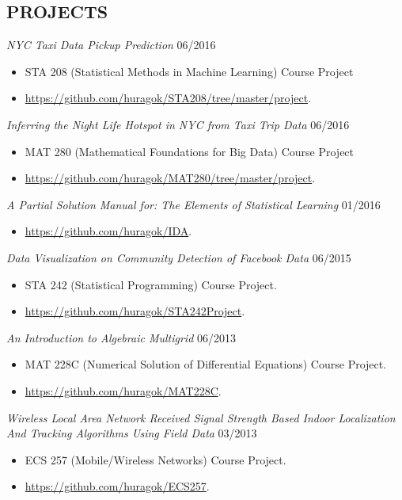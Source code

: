 \documentclass[margin]{res} %
\begin{document}
\begin{resume}
        \section{PROJECTS}
        {\sl NYC Taxi Data Pickup Prediction} \hfill 06/2016
        \begin{itemize} 
          \item STA 208 (Statistical Methods in Machine Learning) Course Project 
          \item \url{https://github.com/huragok/STA208/tree/master/project}.
        \end{itemize}
        
        {\sl Inferring the Night Life Hotspot in NYC from Taxi Trip Data} \hfill
        06/2016
        \begin{itemize} 
          \item MAT 280 (Mathematical Foundations for Big Data) Course Project 
          \item \url{https://github.com/huragok/MAT280/tree/master/project}.
        \end{itemize}
        
        {\sl A Partial Solution Manual for: The Elements of Statistical Learning
        } \hfill 01/2016
        \begin{itemize} 
            \item \url{https://github.com/huragok/IDA}.
        \end{itemize}
        
        {\sl Data Visualization on Community Detection of Facebook Data}
        \hfill 06/2015
        \begin{itemize} 
            \item STA 242 (Statistical Programming) Course Project.
            \item \url{https://github.com/huragok/STA242Project}.
        \end{itemize}
        
        {\sl An Introduction to Algebraic Multigrid}
        \hfill 06/2013
        \begin{itemize} 
            \item MAT 228C (Numerical Solution of Differential Equations) Course
            Project.
            \item \url{https://github.com/huragok/MAT228C}.
        \end{itemize}
        
        {\sl Wireless Local Area Network Received Signal
        Strength Based Indoor Localization And Tracking Algorithms Using Field
        Data} \hfill 03/2013
        \begin{itemize} 
            \item ECS 257 (Mobile/Wireless Networks) Course Project.
            \item \url{https://github.com/huragok/ECS257}.
        \end{itemize}
        

\end{resume}
\end{document}
